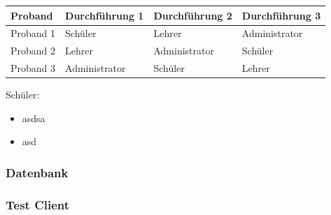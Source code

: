 \begin{table}[h]
	\centering
	\begin{tabu} to 0.9\textwidth {l X X X}
	\toprule
		Proband & Durchführung 1 & Durchführung 2 & Durchführung 3 \\ 
	\midrule
		Proband 1 & Schüler & Lehrer & Administrator \\
		Proband 2 & Lehrer & Administrator & Schüler \\
		Proband 3 & Administrator & Schüler & Lehrer \\
	\bottomrule
	\end{tabu}
	\label{Usability Test Rollen}
\end{table}






Schüler: \\
\begin{itemize}
	\item asdsa
	\item asd
\end{itemize}




\subsubsection*{Datenbank}

\subsubsection*{Test Client}
